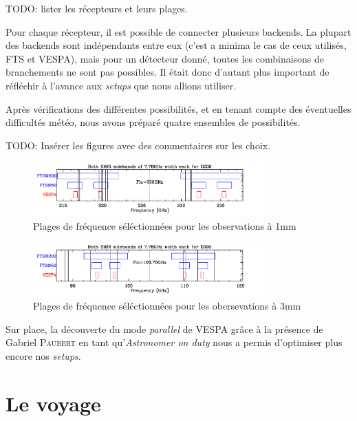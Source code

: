 \documentclass[a4paper,10pt,french]{article}
\begin{document}
TODO: lister les récepteurs et leurs plages.

Pour chaque récepteur, il est possible de connecter plusieurs backends. La
plupart des backends sont indépendants entre eux (c’est a minima le cas de ceux
utilisés, FTS et VESPA), mais pour un détecteur donné, toutes les combinaisons
de branchements ne sont pas possibles. Il était donc d’autant plus important de
réfléchir à l’avance aux \textit{setups} que nous allions utiliser.

Après vérifications des différentes possibilités, et en tenant compte des éventuelles
difficultés météo, nous avons préparé quatre ensembles de possibilités.

TODO: Insérer les figures avec des commentaires sur les choix.
   \begin{figure}
   \centering
   \includegraphics[width=0.8\textwidth]{figures/specsetup-1mm.pdf}
      \caption{Plages de fréquence séléctionnées pour les observations à 1mm
              }
         \label{FigVibStab}
   \end{figure}

   \begin{figure}
   \centering
   \includegraphics[width=0.8\textwidth]{figures/specsetup-3mm.pdf}
      \caption{Plages de fréquence séléctionnées pour les obersevations à 3mm
              }
         \label{FigVibStab}
   \end{figure}
Sur place, la découverte du mode \textit{parallel} de VESPA grâce à la présence
de Gabriel \textsc{Paubert} en tant qu’\textit{Astronomer on duty} nous a
permis d’optimiser plus encore nos \textit{setups}.

\section{Le voyage}
\end{document}
